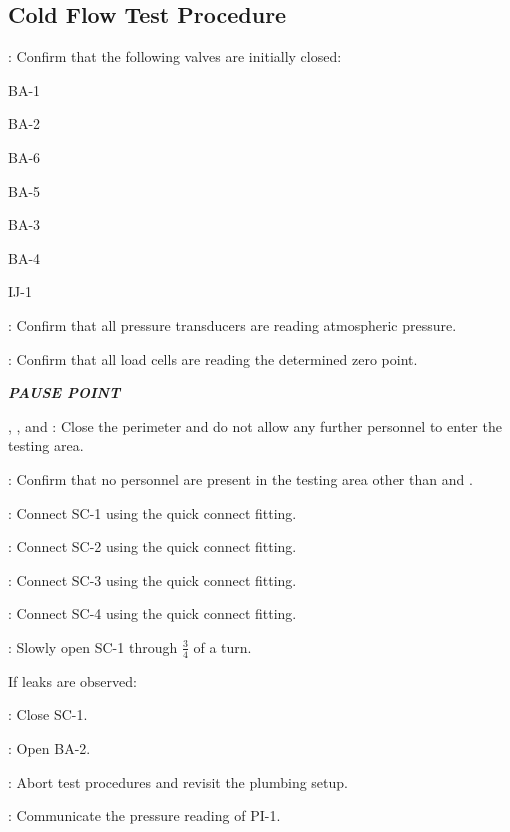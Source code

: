 \subsection{Cold Flow Test Procedure}
\begin{checklist}
    \item \primary{}: Confirm that the following valves are initially closed:
    \begin{checklist}
		\item BA-1
        \item BA-2
        \item BA-6
        \item BA-5
		\item BA-3
		\item BA-4
		\item IJ-1
    \end{checklist}
    \item \daq{}: Confirm that all pressure transducers are reading atmospheric pressure.
    \item \daq{}: Confirm that all load cells are reading the determined zero point.
    \item \textbf{\textit{PAUSE POINT}}
    \item \peri{}, \perii{}, and \periii{}: Close the perimeter and do not allow any further personnel to enter the testing area.
    \item \secondary: Confirm that no personnel are present in the testing area other than \primary{} and \secondary.
    \item \primary{}: Connect SC-1 using the quick connect fitting.
    \item \primary{}: Connect SC-2 using the quick connect fitting.
    \item \primary{}: Connect SC-3 using the quick connect fitting.
    \item \primary{}: Connect SC-4 using the quick connect fitting.
    \item \primary{}: Slowly open SC-1 through $\frac{3}{4}$ of a turn.
    \item If leaks are observed:
    \begin{checklist}
            \item \primary{}: Close SC-1. 
            \item \primary{}: Open BA-2. 
            \item \ops{}: Abort test procedures and revisit the plumbing setup. 
    \end{checklist}
    \item \primary{}: Communicate the pressure reading of PI-1. 

\end{checklist}
